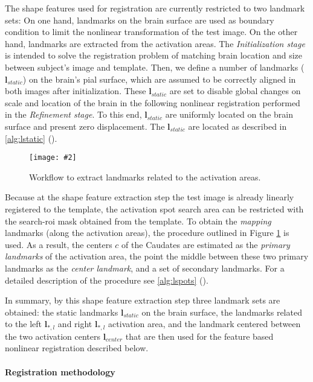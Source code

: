 \documentclass{frontiers}
\newcommand{\insertgraphic}[2]{\texttt{[image: \#2]}}
\newcommand{\insertgraphic}[2]{\texttt{[image: \#2]}}
\newcommand{\lm}[1]{\ensuremath{\mathbf{l}_{#1}}}
\begin{document}
\cbstart
The shape features used for registration are currently restricted to two landmark sets:
\cbend
On one hand, landmarks on the brain surface are used as boundary condition to limit the nonlinear 
  transformation of the test image. 
On the other hand, landmarks are extracted from the activation areas. 
\cbstart
The \emph{Initialization stage} is intended to solve the registration problem of matching brain location
  and size between subject's image and template.
Then, we define a number of landmarks (\lm{static}) on the brain's pial surface, which are assumed
  to be correctly aligned in both images after initialization.
These \lm{static} are set to disable global changes on scale and location of the brain in the following
  nonlinear registration performed in the \emph{Refinement stage}.
\cbend
To this end, \lm{static} are uniformly located on the brain surface and present
  zero displacement. The \lm{static} are located as described in \autoref{alg:lstatic} ().

\begin{figure}
\centering
\insertgraphic{width=0.75\linewidth}{figures/03-Segflow}
\caption{ \label{fig:featlmextract} Workflow to extract landmarks related to the activation areas. 
}
\end{figure}

Because at the shape feature extraction step the test image is already linearly registered to the template, 
  the activation spot search area can be restricted with the search-\gls*{roi} mask obtained from the template.
To obtain the \emph{mapping} landmarks (along the activation areas), the procedure
  outlined in Figure \ref{fig:featlmextract} is used.
\cbstart
As a result, the centers $c$ of the Caudates are estimated as the \emph{primary landmarks} of the activation area, the point 
    the middle between these two primary landmarks as the \emph{center landmark}, and a set of secondary landmarks. 
For a detailed description of the procedure see \autoref{alg:lspots} ().
\cbend

\cbstart
In summary, by this shape feature extraction step three landmark sets are obtained: the static landmarks \lm{static} on the 
\cbend
  brain surface, the landmarks related to the left \lm{*,l} and right \lm{*,l} activation area, 
  and the  landmark centered between the two activation centers \lm{center} that are then used for the 
  feature based nonlinear registration described below.

\paragraph{Registration methodology}
\label{sec:registration}
\end{document}
